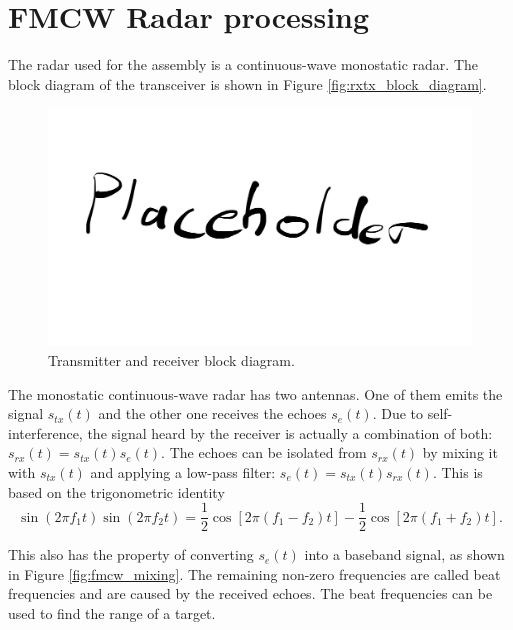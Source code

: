 \section{FMCW Radar processing}
\label{sec:processing}
The radar used for the assembly is a continuous-wave monostatic radar.
The block diagram of the transceiver is shown in Figure \ref{fig:rxtx_block_diagram}.
\begin{figure}
    \centering
    \includegraphics[width=\textwidth]{fig/placeholder.png}
    \caption{Transmitter and receiver block diagram.}
    \label{fig:rxtx_block_diag}
\end{figure}
The monostatic continuous-wave radar has two antennas.
One of them emits the signal $s_{tx}(t)$ and the other one receives the echoes $s_{e}(t)$.
Due to self-interference, the signal heard by the receiver is actually a combination of both: 
$s_{rx}(t) = s_{tx}(t)s_{e}(t)$.
The echoes can be isolated from $s_{rx}(t)$ by mixing it with $s_{tx}(t)$
and applying a low-pass filter: $s_{e}(t) = s_{tx}(t)s_{rx}(t)$.
This is based on the trigonometric identity
\begin{equation}
    \label{eq:trig}
    \sin (2 \pi f_1 t) \sin (2 \pi f_2 t) 
    = \frac{1}{2} \cos [2 \pi ( f_1 - f_2 )t] - \frac{1}{2} \cos [2 \pi ( f_1 + f_2 ) t].
\end{equation}

This also has the property of converting $s_{e}(t)$ into a baseband signal,
as shown in Figure \ref{fig:fmcw_mixing}.
The remaining non-zero frequencies are called beat frequencies
 and are caused by the received echoes.
The beat frequencies can be used to find the range of a target.

